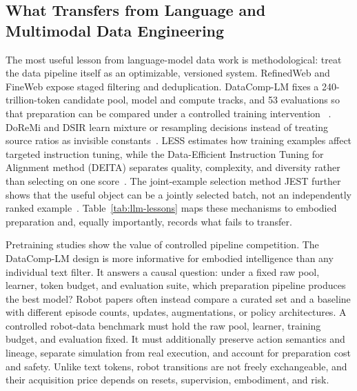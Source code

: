 \subsection{What Transfers from Language and Multimodal Data Engineering}

The most useful lesson from language-model data work is methodological: treat the data pipeline itself as an optimizable, versioned system.
RefinedWeb and FineWeb expose staged filtering and deduplication.
DataComp-LM fixes a 240-trillion-token candidate pool, model and compute tracks, and 53 evaluations so that preparation can be compared under a controlled training intervention ~\cite{penedo2023refinedweb_2306_01116,penedo2024fineweb_2406_17557,li2024datacomp_2406_11794}.
DoReMi and DSIR learn mixture or resampling decisions instead of treating source ratios as invisible constants~\cite{xie2023doremi_2305_10429,xie2023data_2302_03169}.
LESS estimates how training examples affect targeted instruction tuning, while the Data-Efficient Instruction Tuning for Alignment method (DEITA) separates quality, complexity, and diversity rather than selecting on one score~\cite{xia2024less_2402_04333,liu2023what_2312_15685}.
The joint-example selection method JEST further shows that the useful object can be a jointly selected batch, not an independently ranked example~\cite{evans2024data_2406_17711}.
Table~\ref{tab:llm-lessons} maps these mechanisms to embodied preparation and, equally importantly, records what fails to transfer.



Pretraining studies show the value of controlled pipeline competition.
The DataComp-LM design is more informative for embodied intelligence than any individual text filter.
It answers a causal question: under a fixed raw pool, learner, token budget, and evaluation suite, which preparation pipeline produces the best model?
Robot papers often instead compare a curated set and a baseline with different episode counts, updates, augmentations, or policy architectures.
A controlled robot-data benchmark must hold the raw pool, learner, training budget, and evaluation fixed.
It must additionally preserve action semantics and lineage, separate simulation from real execution, and account for preparation cost and safety.
Unlike text tokens, robot transitions are not freely exchangeable, and their acquisition price depends on resets, supervision, embodiment, and risk.

